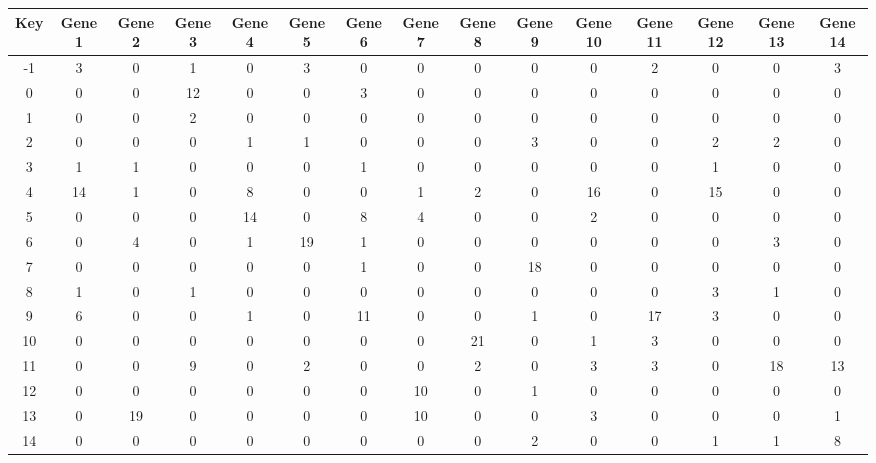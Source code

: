 \begin{tabular}{|c|c|c|c|c|c|c|c|c|c|c|c|c|c|c|}
\hline
Key & Gene 1 & Gene 2 & Gene 3 & Gene 4 & Gene 5 & Gene 6 & Gene 7 & Gene 8 & Gene 9 & Gene 10 & Gene 11 & Gene 12 & Gene 13 & Gene 14 \\
\hline
-1 & 3 & 0 & 1 & 0 & 3 & 0 & 0 & 0 & 0 & 0 & 2 & 0 & 0 & 3 \\
0 & 0 & 0 & 12 & 0 & 0 & 3 & 0 & 0 & 0 & 0 & 0 & 0 & 0 & 0 \\
1 & 0 & 0 & 2 & 0 & 0 & 0 & 0 & 0 & 0 & 0 & 0 & 0 & 0 & 0 \\
2 & 0 & 0 & 0 & 1 & 1 & 0 & 0 & 0 & 3 & 0 & 0 & 2 & 2 & 0 \\
3 & 1 & 1 & 0 & 0 & 0 & 1 & 0 & 0 & 0 & 0 & 0 & 1 & 0 & 0 \\
4 & 14 & 1 & 0 & 8 & 0 & 0 & 1 & 2 & 0 & 16 & 0 & 15 & 0 & 0 \\
5 & 0 & 0 & 0 & 14 & 0 & 8 & 4 & 0 & 0 & 2 & 0 & 0 & 0 & 0 \\
6 & 0 & 4 & 0 & 1 & 19 & 1 & 0 & 0 & 0 & 0 & 0 & 0 & 3 & 0 \\
7 & 0 & 0 & 0 & 0 & 0 & 1 & 0 & 0 & 18 & 0 & 0 & 0 & 0 & 0 \\
8 & 1 & 0 & 1 & 0 & 0 & 0 & 0 & 0 & 0 & 0 & 0 & 3 & 1 & 0 \\
9 & 6 & 0 & 0 & 1 & 0 & 11 & 0 & 0 & 1 & 0 & 17 & 3 & 0 & 0 \\
10 & 0 & 0 & 0 & 0 & 0 & 0 & 0 & 21 & 0 & 1 & 3 & 0 & 0 & 0 \\
11 & 0 & 0 & 9 & 0 & 2 & 0 & 0 & 2 & 0 & 3 & 3 & 0 & 18 & 13 \\
12 & 0 & 0 & 0 & 0 & 0 & 0 & 10 & 0 & 1 & 0 & 0 & 0 & 0 & 0 \\
13 & 0 & 19 & 0 & 0 & 0 & 0 & 10 & 0 & 0 & 3 & 0 & 0 & 0 & 1 \\
14 & 0 & 0 & 0 & 0 & 0 & 0 & 0 & 0 & 2 & 0 & 0 & 1 & 1 & 8 \\
\hline
\end{tabular}